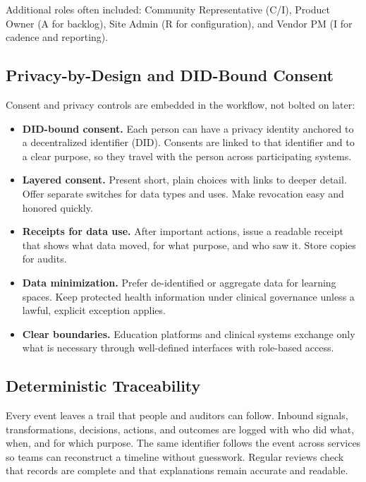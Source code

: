 \documentclass[12pt]{article}
\begin{document}
Additional roles often included: Community Representative (C/I), Product Owner (A for backlog), Site Admin (R for configuration), and Vendor PM (I for cadence and reporting).

\subsection*{Privacy-by-Design and DID-Bound Consent}
Consent and privacy controls are embedded in the workflow, not bolted on later:
\begin{itemize}[leftmargin=*]
  \item \textbf{DID-bound consent.} Each person can have a privacy identity anchored to a decentralized identifier (DID). Consents are linked to that identifier and to a clear purpose, so they travel with the person across participating systems.
  \item \textbf{Layered consent.} Present short, plain choices with links to deeper detail. Offer separate switches for data types and uses. Make revocation easy and honored quickly.
  \item \textbf{Receipts for data use.} After important actions, issue a readable receipt that shows what data moved, for what purpose, and who saw it. Store copies for audits.
  \item \textbf{Data minimization.} Prefer de-identified or aggregate data for learning spaces. Keep protected health information under clinical governance unless a lawful, explicit exception applies.
  \item \textbf{Clear boundaries.} Education platforms and clinical systems exchange only what is necessary through well-defined interfaces with role-based access.
\end{itemize}

\subsection*{Deterministic Traceability}
Every event leaves a trail that people and auditors can follow. Inbound signals, transformations, decisions, actions, and outcomes are logged with who did what, when, and for which purpose. The same identifier follows the event across services so teams can reconstruct a timeline without guesswork. Regular reviews check that records are complete and that explanations remain accurate and readable.
\end{document}
